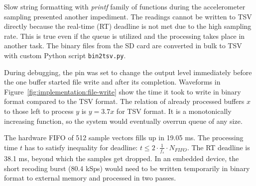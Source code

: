 Slow string formatting with \emph{printf} family of functions during the accelerometer sampling presented another impediment. The readings cannot be written to TSV directly because the real-time (RT) deadline is not met due to the high sampling rate. This is true even if the queue is utilized and the processing takes place in another task. The binary files from the SD card are converted in bulk to TSV with custom Python script \verb|bin2tsv.py|.

During debugging, the pin was set to change the output level immediately before the one buffer started file write and after its completion. Waveforms in Figure~\ref{fig:implementation:file-write} show the time it took to write in binary format compared to the TSV format. The relation of already processed buffers $x$ to those left to process $y$ is $y = 3.7x$ for TSV format. It is a monotonically increasing function, so the system would eventually overrun queue of any size.

The hardware FIFO of 512 sample vectors fills up in 19.05 ms. The processing time $t$ has to satisfy inequality for deadline: $t \leq 2 \cdot \frac{1}{f_s} \cdot N_{FIFO} $. The RT deadline is 38.1 ms, beyond which the samples get dropped. In an embedded device, the short recoding burst (80.4 kSps) would need to be written temporarily in binary format to external memory and processed in two passes.

